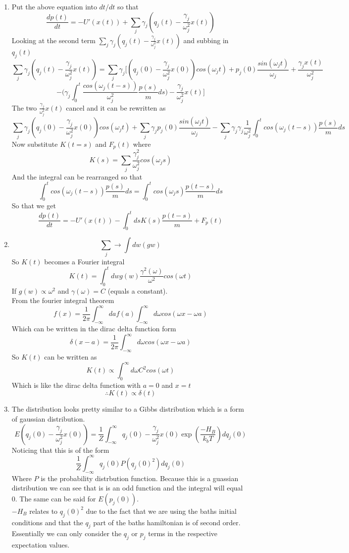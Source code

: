 \documentclass[10pt,a4paper,oneside]{article}
\begin{document}
\begin{enumerate}
    \item Put the above equation into $dt/dt$ so that
    $$ \frac{dp(t)}{dt} = -U'(x(t)) + \sum_j \gamma_j ( q_j(t) - \frac{\gamma_j}{\omega_j^2}x(t))$$
    Looking at the second term $\sum_j \gamma_j ( q_j(t) - \frac{\gamma_j}{\omega_j^2}x(t))$ and subbing in $q_j(t)$ 
    $$ \sum_j \gamma_j ( q_j(t) - \frac{\gamma_j}{\omega_j^2}x(t)) = \sum_j \gamma_j \Big[ (q_j(0) - \frac{\gamma_j}{\omega_j^2} x(0))cos(\omega_j t) + p_j(0) \frac{sin(\omega_j t)}{\omega_j} + \frac{\gamma_j x(t)}{\omega_j^2} $$
    $$- \Big(\gamma_j \int_0^t \frac{cos(\omega_j (t-s))}{\omega_j^2} \frac{p(s)}{m} ds\Big)-\frac{\gamma_j}{\omega_j^2}x(t)\Big] $$
    The two $\frac{\gamma_j}{\omega_j^2} x(t)$ cancel and it can be rewritten as 
    $$ \sum_j \gamma_j (q_j(0) - \frac{\gamma_j}{\omega_j^2} x(0))cos(\omega_j t) + \sum_j \gamma_j p_j(0) \frac{sin(\omega_j t)}{\omega_j} - \sum_j \gamma_j \gamma_j \frac{1}{\omega_j^2} \int_0^t cos(\omega_j(t-s)) \frac{p(s)}{m} ds $$
    Now substitute $K(t=s)$ and $F_p(t)$ where
    $$ K(s) = \sum_j \frac{\gamma_j^2}{\omega_j^2}cos(\omega_j s) $$
    And the integral can be rearranged so that
    $$ \int_0^t cos(\omega_j(t-s)) \frac{p(s)}{m} ds = \int_0^t cos(\omega_j s) \frac{p(t-s)}{m} ds $$
    So that we get  
    $$ \frac{dp(t)}{dt} = -U'(x(t)) - \int_0^t ds K(s) \frac{p(t-s)}{m} + F_p(t) $$

    \item $$\sum_j \rightarrow \int dw (gw) $$
    So $K(t)$ becomes a Fourier integral 
    $$ K(t) = \int_0^t dw g(w) \frac{\gamma^2(\omega)}{\omega^2} cos(\omega t) $$
    If $g(w) \propto \omega^2$ and $\gamma(\omega) = C $ (equals a constant). 
    \\
    From the fourier integral theorem 
    $$ f(x) = \frac{1}{2\pi} \int_{-\infty}^{\infty} da f(a) \int_{-\infty}^{\infty} d \omega cos(\omega x - \omega a) $$
    Which can be written in the dirac delta function form 
    $$ \delta (x-a) = \frac{1}{2\pi} \int_{-\infty}^{\infty} d \omega cos(\omega x - \omega a) $$
    So $K(t)$ can be written as 
    $$ K(t) \propto \int_0^\infty d \omega C^2 cos(\omega t) $$
    Which is like the dirac delta function with $a=0$ and $x=t$ 
    $$ \therefore  K(t) \propto \delta(t)$$

    \item The distribution looks pretty similar to a Gibbs distribution which is a form of gaussian distribution.
    $$ E(q_j(0) - \frac{\gamma_j}{\omega_j^2} x(0) ) = \frac{1}{Z} \int_{-\infty}^{\infty} q_j(0) - \frac{\gamma_j}{\omega_j^2} x(0) \exp(\frac{-H_B}{k_b T}) dq_j(0)$$
    Noticing that this is of the form 
    $$ \frac{1}{Z} \int_{-\infty}^{\infty} q_j(0) P(q_j(0)^2) d q_j(0) $$
    Where $P$ is the probability distrbution function. Because this is a guassian distribution we can see that is is an odd function and the integral will equal 0. The same can be said for $E(p_j(0)) $.
    \\
    $-H_B$ relates to $q_j(0)^2$ due to the fact that we are using the baths initial conditions and that the $q_j$ part of the baths hamiltonian is of second order. Essentially we can only consider the $q_j$ or $p_j$ terms in the respective expectation values. 


\end{enumerate}
\end{document}
